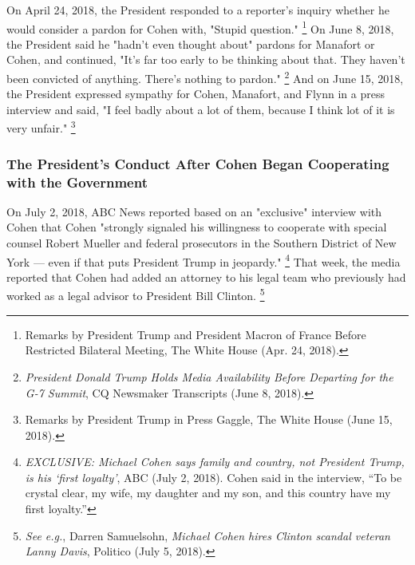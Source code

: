 On April 24, 2018, the President responded to a reporter's inquiry whether he would consider a pardon for Cohen with, "Stupid question."%
\footnote{Remarks by President Trump and President Macron of France Before Restricted Bilateral Meeting, The White House (Apr. 24, 2018).}
On June 8, 2018, the President said he "hadn't even thought about" pardons for Manafort or Cohen, and continued, "It's far too early to be thinking about that.
They haven't been convicted of anything.
There's nothing to pardon."%
\footnote{\textit{President Donald Trump Holds Media Availability Before Departing for the G-7 Summit}, CQ Newsmaker Transcripts (June 8, 2018).}
And on June 15, 2018, the President expressed sympathy for Cohen, Manafort, and Flynn in a press interview and said, "I feel badly about a lot of them, because I think lot of it is very unfair."%
\footnote{Remarks by President Trump in Press Gaggle, The White House (June 15, 2018).}

\subsubsection{The President's Conduct After Cohen Began Cooperating with the Government}

On July 2, 2018, ABC News reported based on an "exclusive" interview with Cohen that Cohen "strongly signaled his willingness to cooperate with special counsel Robert Mueller and federal prosecutors in the Southern District of New York — even if that puts President Trump in jeopardy."%
\footnote{\textit{EXCLUSIVE: Michael Cohen says family and country, not President Trump, is his ‘first loyalty’}, ABC (July 2, 2018).
Cohen said in the interview, “To be crystal clear, my wife, my daughter and my son, and this country have my first loyalty.”}
That week, the media reported that Cohen had added an attorney to his legal team who previously had worked as a legal advisor to President Bill Clinton.%
\footnote{\textit{See e.g.}, Darren Samuelsohn, \textit{Michael Cohen hires Clinton scandal veteran Lanny Davis}, Politico (July 5, 2018).}

